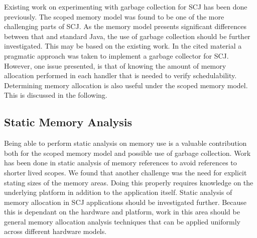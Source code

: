 Existing work on experimenting with garbage collection for SCJ has been done previously\cite{Schoeberl:2007:GCS:1288940.1288953}. The scoped memory model was found to be one of the more challenging parts of SCJ. As the memory model presents significant differences between that and standard Java, the use of garbage collection should be further investigated. This may be based on the existing work. In the cited material a pragmatic approach was taken to implement a garbage collector for SCJ. However, one issue presented, is that of knowing the amount of memory allocation performed in each handler that is needed to verify schedulability. Determining memory allocation is also useful under the scoped memory model. This is discussed in the following.

\subsection{Static Memory Analysis} %
\label{sub:memoryanalysis}
Being able to perform static analysis on memory use is a valuable contribution both for the scoped memory model and possible use of garbage collection. Work has been done in static analysis of memory references to avoid references to shorter lived scopes\cite{Dalsgaard:2012:PMA:2388936.2388939}. We found that another challenge was the need for explicit stating sizes of the memory areas. Doing this properly requires knowledge on the underlying platform in addition to the application itself. Static analysis of memory allocation in SCJ applications should be investigated further. Because this is dependant on the hardware and platform, work in this area should be general memory allocation analysis techniques that can be applied uniformly across different hardware models.


